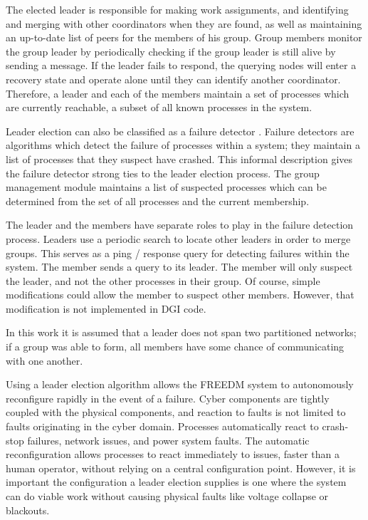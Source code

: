 The elected leader is responsible for making work assignments, and identifying and merging with other coordinators when they are found, as well as maintaining an up-to-date list of peers for the members of his group. 
Group members monitor the group leader by periodically checking if the group leader is still alive by sending a message. 
If the leader fails to respond, the querying nodes will enter a recovery state and operate alone until
they can identify another coordinator.
Therefore, a leader and each of the members maintain a set of processes which are currently reachable, a subset of all known processes in the system.

Leader election can also be classified as a failure detector \cite{LEADERELECTIONEVAL}.
Failure detectors are algorithms which detect the failure of processes within a system; they maintain a list of processes that they suspect have crashed.
This informal description gives the failure detector strong ties to the leader election process. 
The group management module maintains a list of suspected processes which can be determined from the set of all processes and the current membership.

The leader and the members have separate roles to play in the failure detection process.
Leaders use a periodic search to locate other leaders in order to merge groups.
This serves as a ping / response query for detecting failures within the system.
The member sends a query to its leader.
The member will only suspect the leader, and not the other processes in their group.
Of course, simple modifications could allow the member to suspect other members.
However, that modification is not implemented in DGI code.

In this work it is assumed that a leader does not span two partitioned networks; if a group was able to form, all members have some chance of communicating with one another.

Using a leader election algorithm allows the \ac{FREEDM} system to autonomously reconfigure rapidly in the event of a failure.
Cyber components are tightly coupled with the physical components, and reaction to faults is not limited to faults originating in the cyber domain.
Processes automatically react to crash-stop failures, network issues, and power system faults.
The automatic reconfiguration allows processes to react immediately to issues, faster than a human operator, without relying on a central configuration point.
However, it is important the configuration a leader election supplies is one where the system can do viable work without causing physical faults like voltage collapse or blackouts\cite{HARINI}.

